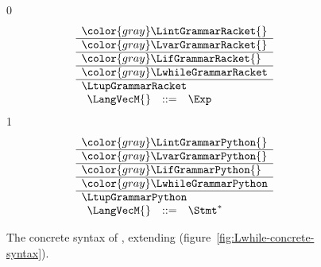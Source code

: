 \documentclass[7x10]{TimesAPriori_MIT}%
\newcommand{\gray}[1]{{\color{gray} #1}}
\def\racketEd{0}
\def\pythonEd{1}
\def\edition{0}
\numberwithin{theorem}{chapter}
\numberwithin{definition}{chapter}
\numberwithin{equation}{chapter}
\begin{document}
  
\begin{figure}[tbp]
\centering
\begin{tcolorbox}[colback=white]    
    \small
{\if\edition\racketEd    
\[
\begin{array}{l}
  \gray{\LintGrammarRacket{}} \\ \hline
  \gray{\LvarGrammarRacket{}} \\ \hline
  \gray{\LifGrammarRacket{}} \\ \hline
  \gray{\LwhileGrammarRacket} \\ \hline
  \LtupGrammarRacket \\  
  \begin{array}{lcl}
    \LangVecM{} &::=& \Exp
  \end{array}
\end{array}
\]
\fi}
{\if\edition\pythonEd
\[
\begin{array}{l}
  \gray{\LintGrammarPython{}} \\ \hline
  \gray{\LvarGrammarPython{}} \\ \hline
  \gray{\LifGrammarPython{}} \\ \hline
  \gray{\LwhileGrammarPython} \\ \hline
  \LtupGrammarPython \\  
\begin{array}{rcl}
  \LangVecM{} &::=& \Stmt^{*}
\end{array}
\end{array}
\]
\fi}
\end{tcolorbox}
\caption{The concrete syntax of \LangVec{}, extending \LangLoop{}
  (figure~\ref{fig:Lwhile-concrete-syntax}).}
\label{fig:Lvec-concrete-syntax}
\end{figure}
\end{document}
